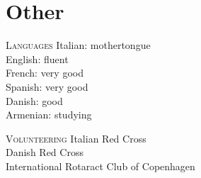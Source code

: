\section*{Other}

\begin{paracol}{2}
  \textsc{Languages}
\switchcolumn
  Italian: mothertongue\\
  English: fluent\\
  French: very good\\
  Spanish: very good\\
  Danish: good\\
  Armenian: studying
\end{paracol}

\vspace{1em}

\begin{paracol}{2}
  \textsc{Volunteering}
\switchcolumn
  Italian Red Cross\\
  Danish Red Cross\\
  International Rotaract Club of Copenhagen
\end{paracol}